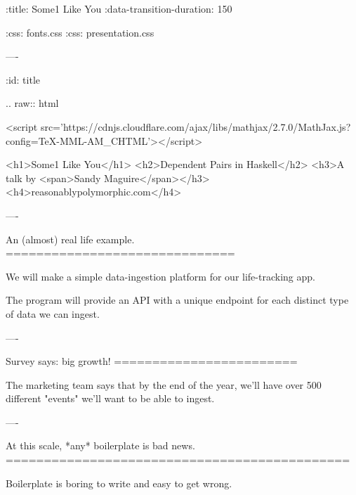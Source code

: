 :title: Some1 Like You
:data-transition-duration: 150

:css: fonts.css
:css: presentation.css


\newenvironment{table}{.. raw:: html

  <table>}{
  </table>
}

\newenvironment{hs}{.. code:: haskell
}{}
\newenvironment{raw}{.. raw:: html

  <pre>}{
  </pre>
}
\newenvironment{custom}{.. raw:: html

  <pre class="highlight code haskell">}{
  </pre>
}
\newcommand{\$}{\begin{verbatim}$\end{verbatim}}
\newcommand{\todo}[2]{#2}
\newcommand{\note}[1]{<span class="new">#1</span>}
\newcommand{\wat}[1]{<span class="wat">#1</span>}
\newcommand{\type}[1]{<span class="type">#1</span>}
\newcommand{\kind}[1]{<span class="kind">#1</span>}
\newcommand{\syn}[2]{<span class="#1">#2</span>}
\newcommand{\pragma}[1]{\{-# LANGUAGE #1 #-\}}
\newcommand{\pragmasyn}[1]{\syn{cm}{\{-# LANGUAGE #1 #-\}}}
\newcommand{\b}[1]{<pre class="highlight haskell code">#1</pre>}

----

:id: title

.. raw:: html

  <script src='https://cdnjs.cloudflare.com/ajax/libs/mathjax/2.7.0/MathJax.js?config=TeX-MML-AM_CHTML'></script>

  <h1>Some1 Like You</h1>
  <h2>Dependent Pairs in Haskell</h2>
  <h3>A talk by <span>Sandy Maguire</span></h3>
  <h4>reasonablypolymorphic.com</h4>

----

An (almost) real life example.
==============================

We will make a simple data-ingestion platform for our life-tracking app.

The program will provide an API with a unique endpoint for each distinct type of data we can ingest.

----

Survey says: big growth!
========================

The marketing team says that by the end of the year, we'll have over 500 different "events" we'll want to be able to
ingest.

----

At this scale, *any* boilerplate is bad news.
=============================================

Boilerplate is boring to write and easy to get wrong.

